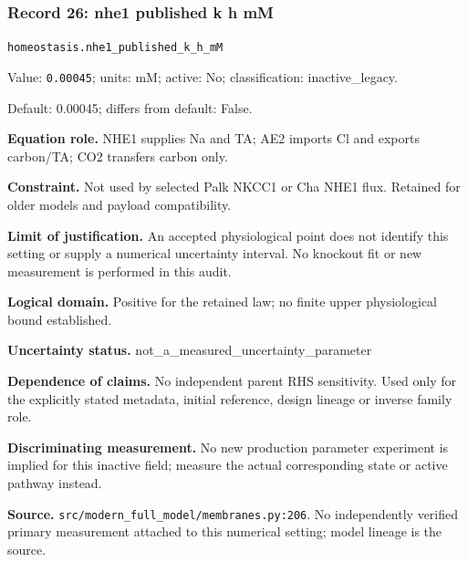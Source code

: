 \subsubsection*{Record 26: nhe1 published k h mM}
{\small \nolinkurl{homeostasis.nhe1_published_k_h_mM}\par

Value: \texttt{0.00045}; units: mM; active: No; classification: inactive\_legacy.\par

Default: 0.00045; differs from default: False.\par

\textbf{Equation role.} NHE1 supplies Na and TA; AE2 imports Cl and exports carbon/TA; CO2 transfers carbon only.\par

\textbf{Constraint.} Not used by selected Palk NKCC1 or Cha NHE1 flux. Retained for older models and payload compatibility.\par

\textbf{Limit of justification.} An accepted physiological point does not identify this setting or supply a numerical uncertainty interval. No knockout fit or new measurement is performed in this audit.\par

\textbf{Logical domain.} Positive for the retained law; no finite upper physiological bound established.\par

\textbf{Uncertainty status.} not\_a\_measured\_uncertainty\_parameter\par

\textbf{Dependence of claims.} No independent parent RHS sensitivity. Used only for the explicitly stated metadata, initial reference, design lineage or inverse family role.\par

\textbf{Discriminating measurement.} No new production parameter experiment is implied for this inactive field; measure the actual corresponding state or active pathway instead.\par

\textbf{Source.} \nolinkurl{src/modern_full_model/membranes.py:206}. No independently verified primary measurement attached to this numerical setting; model lineage is the source.\par}

